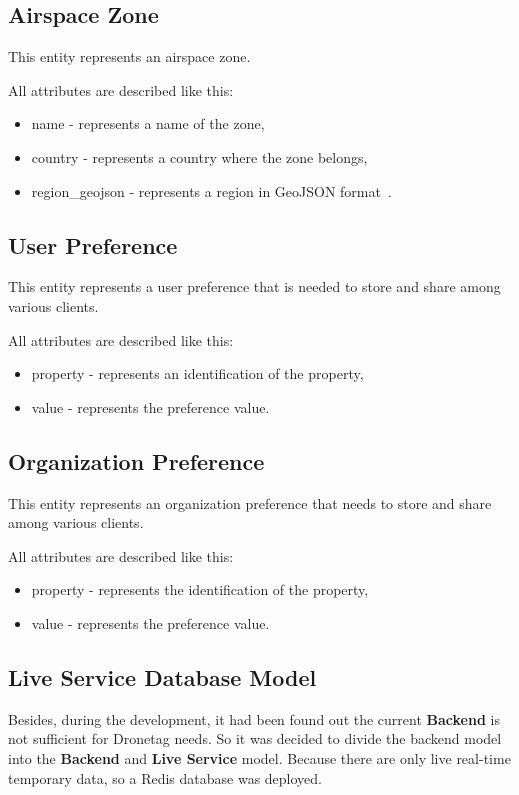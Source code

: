 \subsection{Airspace Zone}\label{subsec:airspace-zone}
This entity represents an airspace zone.

All attributes are described like this:
\begin{itemize}
    \item name - represents a name of the zone,
    \item country - represents a country where the zone belongs,
    \item region\_geojson - represents a region in GeoJSON format~\cite{geoJson}.
\end{itemize}

\subsection{User Preference}\label{subsec:user-preference}
This entity represents a user preference that is needed to store and share among various clients.

All attributes are described like this:
\begin{itemize}
    \item property - represents an identification of the property,
    \item value - represents the preference value.
\end{itemize}

\subsection{Organization Preference}\label{subsec:organization-preference}
This entity represents an organization preference that needs to store and share among various clients.

All attributes are described like this:
\begin{itemize}
    \item property - represents the identification of the property,
    \item value - represents the preference value.
\end{itemize}

\subsection{Live Service Database Model}\label{subsec:live-service-database-model}
Besides, during the development, it had been found out the current \textbf{Backend} is not sufficient for Dronetag needs.
So it was decided to divide the backend model into the \textbf{Backend} and \textbf{Live Service} model.
Because there are only live real-time temporary data, so a Redis database was deployed.

